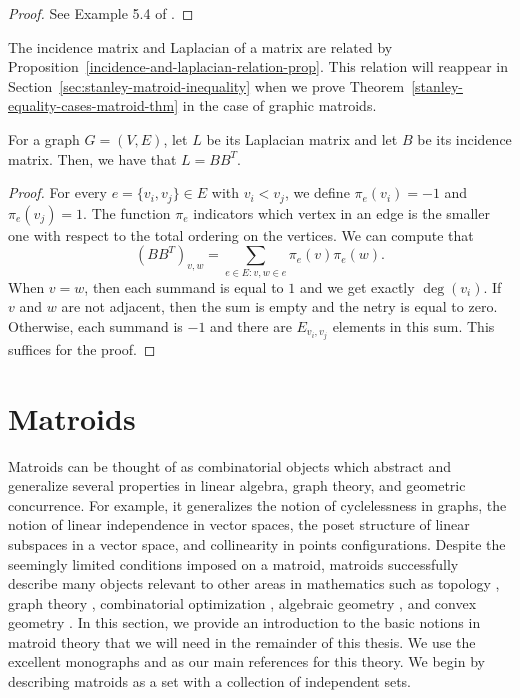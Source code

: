 \documentclass{puthesis-UG}
\begin{document}
\begin{proof}
	See Example 5.4 of \cite{bapat_raghavan_1997}. 
\end{proof}

The incidence matrix and Laplacian of a matrix are related by Proposition~\ref{incidence-and-laplacian-relation-prop}. This relation will reappear in Section~\ref{sec:stanley-matroid-inequality} when we prove Theorem~\ref{stanley-equality-cases-matroid-thm} in the case of graphic matroids. 

\begin{prop} \label{incidence-and-laplacian-relation-prop}
	For a graph $G = (V, E)$, let $L$ be its Laplacian matrix and let $B$ be its incidence matrix. Then, we have that $L = BB^T$. 
\end{prop}

\begin{proof}
	For every $e = \{v_i, v_j\} \in E$ with $v_i < v_j$, we define $\pi_e(v_i) = -1$ and $\pi_e (v_j) = 1$. The function $\pi_e$ indicators which vertex in an edge is the smaller one with respect to the total ordering on the vertices. We can compute that 
	\[
		\left ( BB^T \right )_{v, w} = \sum_{e \in E : v, w \in e} \pi_e(v) \pi_e(w). 
	\]
	When $v = w$, then each summand is equal to $1$ and we get exactly $\deg (v_i)$. If $v$ and $w$ are not adjacent, then the sum is empty and the netry is equal to zero. Otherwise, each summand is $-1$ and there are $E_{v_i, v_j}$ elements in this sum. This suffices for the proof. 
\end{proof}

\section{Matroids} \label{sec:matroids}

Matroids can be thought of as combinatorial objects which abstract and generalize several properties in linear algebra, graph theory, and geometric concurrence. For example, it generalizes the notion of cyclelessness in graphs, the notion of linear independence in vector spaces, the poset structure of linear subspaces in a vector space, and collinearity in points configurations. Despite the seemingly limited conditions imposed on a matroid, matroids successfully describe many objects relevant to other areas in mathematics such as topology \cite{gelfand}, graph theory \cite{milnor-numbers}, combinatorial optimization \cite{optimization}, algebraic geometry \cite{schubert-cell}, and convex geometry \cite{matroid-polytope}. In this section, we provide an introduction to the basic notions in matroid theory that we will need in the remainder of this thesis. We use the excellent monographs \cite{10.5555/1197093} and \cite{welsh} as our main references for this theory. We begin by describing matroids as a set with a collection of independent sets. 
\end{document}
